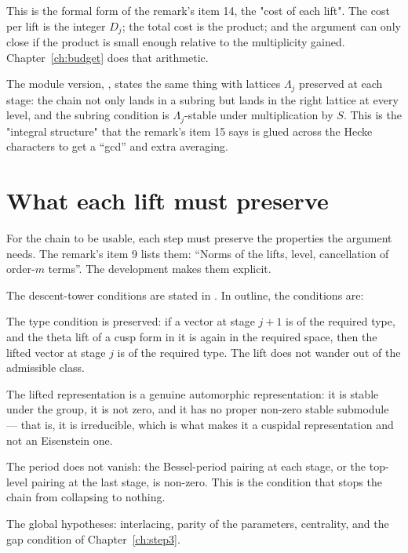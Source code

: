 This is the formal form of the remark's item 14, the "cost of each lift". The
cost per lift is the integer $D_j$; the total cost is the product; and the
argument can only close if the product is small enough relative to the
multiplicity gained. Chapter~\ref{ch:budget} does that arithmetic.

The module version, , states the same thing with lattices
$\Lambda_j$ preserved at each stage: the chain not only lands in a subring but
lands in the right lattice at every level, and the subring condition is
$\Lambda_j$-stable under multiplication by $S$. This is the "integral
structure" that the remark's item 15 says is glued across the Hecke
characters to get a ``gcd'' and extra averaging.

\section{What each lift must preserve}For the chain to be usable, each step must preserve the properties the
argument needs. The remark's item 9 lists them: ``Norms of the lifts, level,
cancellation of order-$m$ terms''. The development makes them explicit.

The descent-tower conditions are stated in
. In outline, the conditions are:

\begin{description}[style=nextline,leftmargin=0pt,labelwidth=0pt,labelsep=0pt,font=\sffamily\bfseries\small,
  itemsep=6pt]
\item[\code{IsDv}] The type condition is preserved: if a vector at stage
$j+1$ is of the required type, and the theta lift of a cusp form in it is
again in the required space, then the lifted vector at stage $j$ is of the
required type. The lift does not wander out of the admissible class.
\item[\code{IsAutRep}] The lifted representation is a genuine automorphic
representation: it is stable under the group, it is not zero, and it has no
proper non-zero stable submodule --- that is, it is irreducible, which is
what makes it a cuspidal representation and not an Eisenstein one.
\item[\code{PerNZ}] The period does not vanish: the Bessel-period pairing at
each stage, or the top-level pairing at the last stage, is non-zero. This is
the condition that stops the chain from collapsing to nothing.
\item[\code{Hyp3}] The global hypotheses: interlacing, parity of the
parameters, centrality, and the gap condition of Chapter~\ref{ch:step3}.
\end{description}

